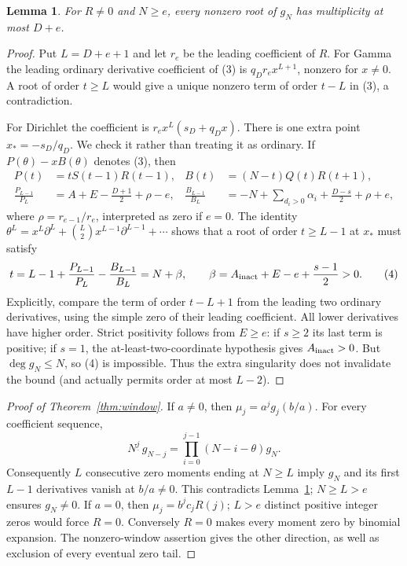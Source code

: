 \documentclass[11pt]{article}
\newtheorem{lemma}[theorem]{Lemma}
\newcommand{\fall}[2]{#1^{\underline{#2}}}
\begin{document}
\begin{lemma}\label{lem:mult}
For $R\ne0$ and $N\geq e$, every nonzero root of $g_N$ has multiplicity
at most $D+e$.
\end{lemma}
\begin{proof}
Put $L=D+e+1$ and let $r_e$ be the leading coefficient of $R$.
For Gamma the leading ordinary derivative coefficient of (3) is
$q_Dr_e x^{L+1}$, nonzero for $x\ne0$. A root of order $t\geq L$
would give a unique nonzero term of order $t-L$ in (3), a contradiction.

For Dirichlet the coefficient is $r_e x^L(s_D+q_Dx)$.
There is one extra point $x_*=-s_D/q_D$. We check it rather than treating
it as ordinary. If $P(\theta)-xB(\theta)$ denotes (3), then
\begin{align*}
 P(t)&=tS(t-1)R(t-1),& B(t)&=(N-t)Q(t)R(t+1),\\
 \frac{P_{L-1}}{P_L}
   &=A+E-\frac{D+1}{2}+\rho-e,&
 \frac{B_{L-1}}{B_L}
   &=-N+\sum_{d_i>0}\alpha_i+\frac{D-s}{2}+\rho+e,
 \end{align*}
where $\rho=r_{e-1}/r_e$, interpreted as zero if $e=0$.
The identity
$\theta^L=x^L\partial^L+\binom L2 x^{L-1}\partial^{L-1}+\cdots$
shows that a root of order $t\geq L-1$ at $x_*$ must satisfy
\[
 t=L-1+\frac{P_{L-1}}{P_L}-\frac{B_{L-1}}{B_L}
   =N+\beta,\qquad
 \beta=A_{\rm inact}+E-e+\frac{s-1}{2}>0.             \tag{4}
\]
Explicitly, compare the term of order $t-L+1$ from the leading two
ordinary derivatives, using the simple zero of their leading coefficient.
All lower derivatives have higher order. Strict positivity follows from
$E\geq e$: if $s\geq2$ its last term is positive; if $s=1$, the
at-least-two-coordinate hypothesis gives $A_{\rm inact}>0$.
But $\deg g_N\leq N$, so (4) is impossible. Thus the extra singularity
does not invalidate the bound (and actually permits order at most $L-2$).
\end{proof}

\begin{proof}[Proof of Theorem~\ref{thm:window}]
If $a\ne0$, then $\mu_j=a^j g_j(b/a)$. For every coefficient sequence,
\[
 \fall Nj\,g_{N-j}
    =\prod_{i=0}^{j-1}(N-i-\theta)g_N.               \tag{5}
\]
Consequently $L$ consecutive zero moments ending at $N\geq L$ imply
$g_N$ and its first $L-1$ derivatives vanish at $b/a\ne0$.
This contradicts Lemma~\ref{lem:mult}; $N\geq L>e$ ensures $g_N\ne0$.
If $a=0$, then $\mu_j=b^j c_jR(j)$; $L>e$ distinct positive integer
zeros would force $R=0$. Conversely $R=0$ makes every moment zero by
binomial expansion. The nonzero-window assertion gives the other
direction, as well as exclusion of every eventual zero tail.
\end{proof}
\end{document}
